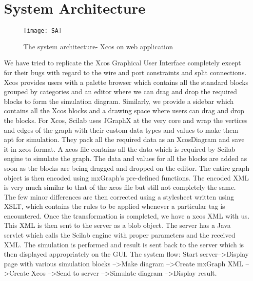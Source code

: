 \documentclass[conference]{IEEEtran}
\begin{document}
\section{System Architecture}
\begin{figure}
    \centering
    \texttt{[image: SA]}
    \caption{The system architecture- Xcos on web application}
    \label{fig:my_label}
\end{figure}
We have tried to replicate the Xcos Graphical User Interface completely except for their bugs with regard to the wire and port constraints and split connections. Xcos provides users with a palette browser which contains all the standard blocks grouped by categories and an editor where we can drag and drop the required blocks to form the simulation diagram.
Similarly, we provide a sidebar which contains all the Xcos blocks and a
drawing space where users can drag and drop the blocks. For Xcos, Scilab uses JGraphX at the very core and wrap the vertices and edges of the graph with their custom data types and values to make them apt for simulation. They pack all the required data as an XcosDiagram and save it in xcos format.
A xcos file contains all the data which is required
by Scilab engine to simulate the graph.
The data and values for all the blocks are added as soon as the blocks
are being dragged and dropped on the editor. The entire graph object
is then encoded using mxGraph's pre-defined functions. The encoded
XML is very much similar to that of the xcos file but still not
completely the same. The few minor differences are then corrected
using a stylesheet written using XSLT, which contains the rules to be applied whenever a particular tag is encountered. Once the transformation is completed, we have a xcos XML with us. This XML is then sent to the server as a blob object.
The server has a Java servlet which calls the Scilab engine with
proper parameters and the received XML. The simulation is
performed and result is sent back to the server which is then displayed
appropriately on the GUI.
The system flow: Start server--\textgreater Display page with various simulation blocks --\textgreater Make diagram --\textgreater Create mxGraph XML --\textgreater Create Xcos --\textgreater Send to server --\textgreater Simulate diagram --\textgreater Display result.
\end{document}
